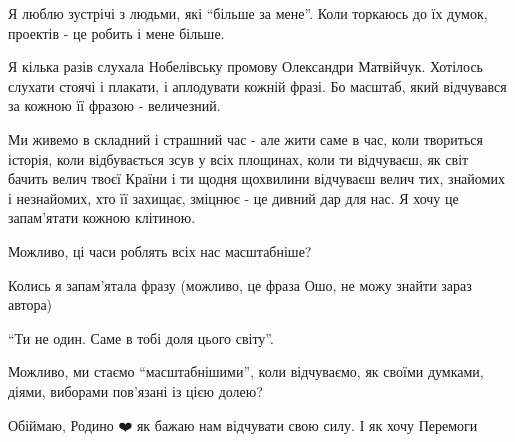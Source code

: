 Я люблю зустрічі з людьми, які \enquote{більше за мене}. Коли торкаюсь до їх думок,
проектів - це робить і мене більше. 

Я кілька разів слухала Нобелівську промову Олександри Матвійчук. Хотілось
слухати стоячі і плакати, і аплодувати кожній фразі. Бо масштаб, який
відчувався за кожною її фразою - величезний. 

Ми живемо в складний і страшний час - але жити саме в час, коли твориться
історія, коли відбувається зсув у всіх площинах, коли ти відчуваєш, як світ
бачить велич твоєї Країни і ти щодня щохвилини відчуваєш велич тих, знайомих і
незнайомих, хто її захищає, зміцнює -  це дивний дар для нас. Я хочу це
запам'ятати кожною клітиною. 

Можливо, ці часи роблять всіх нас масштабніше? 

Колись я запам'ятала фразу (можливо, це фраза Ошо, не можу знайти зараз автора) 

\enquote{Ти не один. Саме в тобі доля цього світу}.

Можливо, ми стаємо \enquote{масштабнішими}, коли відчуваємо, як своїми думками, діями,
виборами пов'язані із цією долею? 

Обіймаю, Родино ❤️ як бажаю нам відчувати свою силу. І як хочу Перемоги

